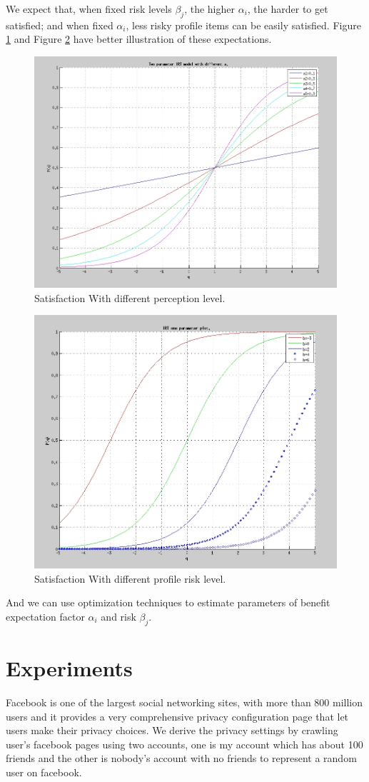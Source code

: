 \documentclass[a4paper]{article}
\begin{document}
We expect that, when fixed risk levels $\beta_j$, the higher
$\alpha_i$, the harder to get satisfied; and when fixed $\alpha_i$,
less risky profile items can be easily satisfied. Figure \ref{fig:irta}
and Figure \ref{fig:irtb} have better illustration of these
expectations. 
\begin{figure}[H]
  \centering
  \includegraphics[width=.7\textwidth]{IRT-a.jpg}
  \caption{Satisfaction With different perception level.} 
  \label{fig:irta}
\end{figure} 

\begin{figure}[H]
  \centering
  \includegraphics[width=.7\textwidth]{IRT-b.jpg}
  \caption{Satisfaction With different profile risk level.} 
  \label{fig:irtb}
\end{figure}

And we can use optimization techniques to estimate parameters of
benefit expectation factor $\alpha_i$ and risk $\beta_j$.

\section{Experiments}
Facebook is one of the largest social networking sites, with more than
800 million users\cite{facebookwiki} and it provides a very
comprehensive privacy configuration page that let users make their
privacy choices. We derive the privacy settings by crawling user's
facebook pages using two accounts, one is my account which has about 100
friends and the other is nobody's account with no friends to represent
a random user on facebook.
\end{document}
